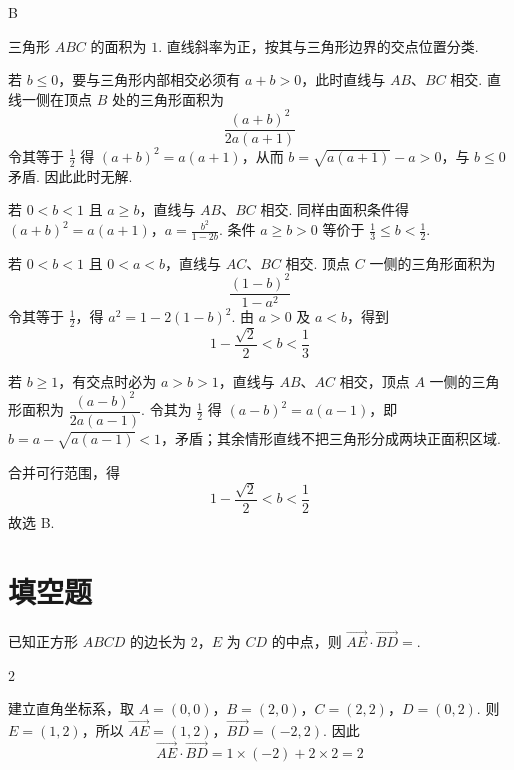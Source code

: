 \begin{answer}
B
\end{answer}

\begin{solution}
三角形 \(ABC\) 的面积为 \(1\). 直线斜率为正，按其与三角形边界的交点位置分类.

若 \(b\leqslant0\)，要与三角形内部相交必须有 \(a+b>0\)，此时直线与 \(AB\)、\(BC\) 相交. 直线一侧在顶点 \(B\) 处的三角形面积为
\[
\frac{(a+b)^2}{2a(a+1)}
\]
令其等于 \(\frac{1}{2}\) 得 \((a+b)^2=a(a+1)\)，从而 \(b=\sqrt{a(a+1)}-a>0\)，与 \(b\leqslant0\) 矛盾. 因此此时无解.

若 \(0<b<1\) 且 \(a\geqslant b\)，直线与 \(AB\)、\(BC\) 相交. 同样由面积条件得
\((a+b)^2=a(a+1)\)，\(a=\frac{b^2}{1-2b}\).
条件 \(a\geqslant b>0\) 等价于 \(\frac13\leqslant b<\frac12\).

若 \(0<b<1\) 且 \(0<a<b\)，直线与 \(AC\)、\(BC\) 相交. 顶点 \(C\) 一侧的三角形面积为
\[
\frac{(1-b)^2}{1-a^2}
\]
令其等于 \(\frac{1}{2}\)，得 \(a^2=1-2(1-b)^2\). 由 \(a>0\) 及 \(a<b\)，得到
\[
1-\frac{\sqrt2}{2}<b<\frac13
\]

若 \(b\geqslant1\)，有交点时必为 \(a>b>1\)，直线与 \(AB\)、\(AC\) 相交，顶点 \(A\) 一侧的三角形面积为 \(\dfrac{(a-b)^2}{2a(a-1)}\). 令其为 \(\frac{1}{2}\) 得 \((a-b)^2=a(a-1)\)，即 \(b=a-\sqrt{a(a-1)}<1\)，矛盾；其余情形直线不把三角形分成两块正面积区域.

合并可行范围，得
\[
1-\frac{\sqrt2}{2}<b<\frac12
\]
故选 B.
\end{solution}

\section{填空题}

\begin{problem}
已知正方形 \(ABCD\) 的边长为 \(2\)，\(E\) 为 \(CD\) 的中点，则 \(\overrightarrow{AE} \cdot \overrightarrow{BD} =\)\fillinblank{}.
\end{problem}

\begin{answer}
\(2\)
\end{answer}

\begin{solution}
建立直角坐标系，取 \(A=(0,0)\)，\(B=(2,0)\)，\(C=(2,2)\)，\(D=(0,2)\). 则 \(E=(1,2)\)，所以
\(\overrightarrow{AE}=(1,2)\)，\(\overrightarrow{BD}=(-2,2)\).
因此
\[
\overrightarrow{AE}\cdot\overrightarrow{BD}=1\times(-2)+2\times2=2
\]
\end{solution}

